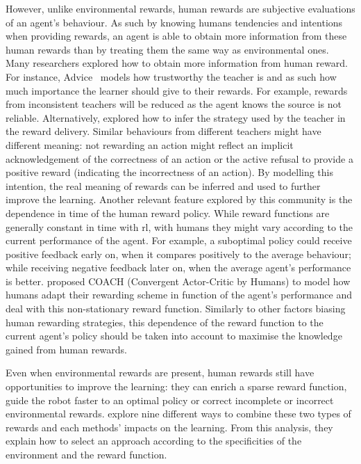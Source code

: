 However, unlike environmental rewards, human rewards are subjective evaluations of an agent's behaviour. As such by knowing humans tendencies and intentions when providing rewards, an agent is able to obtain more information from these human rewards than by treating them the same way as environmental ones. Many researchers explored how to obtain more information from human reward. For instance, Advice~\citep{griffith2013policy} models how trustworthy the teacher is and as such how much importance the learner should give to their rewards. For example, rewards from inconsistent teachers will be reduced as the agent knows the source is not reliable. Alternatively, \cite{loftin2016learning} explored how to infer the strategy used by the teacher in the reward delivery. Similar behaviours from different teachers might have different meaning: not rewarding an action might reflect an implicit acknowledgement of the correctness of an action or the active refusal to provide a positive reward (indicating the incorrectness of an action). By modelling this intention, the real meaning of rewards can be inferred and used to further improve the learning. Another relevant feature explored by this community is the dependence in time of the human reward policy. While reward functions are generally constant in time with \gls{rl}, with humans they might vary according to the current performance of the agent. For example, a suboptimal policy could receive positive feedback early on, when it compares positively to the average behaviour; while receiving negative feedback later on, when the average agent's performance is better. \cite{macglashan2017interactive} proposed COACH (Convergent Actor-Critic by Humans) to model how humans adapt their rewarding scheme in function of the agent's performance and deal with this non-stationary reward function. Similarly to other factors biasing human rewarding strategies, this dependence of the reward function to the current agent's policy should be taken into account to maximise the knowledge gained from human rewards.

Even when environmental rewards are present, human rewards still have opportunities to improve the learning: they can enrich a sparse reward function, guide the robot faster to an optimal policy or correct incomplete or incorrect environmental rewards. \cite{knox2010combining} explore nine different ways to combine these two types of rewards and each methods' impacts on the learning. From this analysis, they explain how to select an approach according to the specificities of the environment and the reward function.

